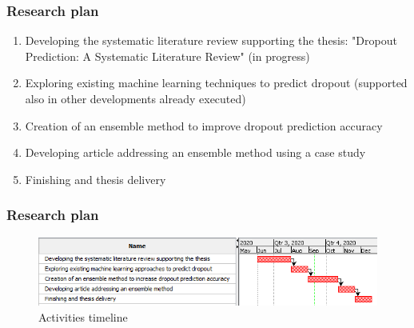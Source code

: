 \documentclass[10pt]{beamer}
\begin{document}

\begin{frame}
	\frametitle{Research plan}
	\begin{enumerate}
		\item Developing the systematic literature review supporting the thesis: "Dropout Prediction: A Systematic Literature Review" (in progress)
		\item Exploring existing machine learning techniques to predict dropout (supported also in other developments already executed)
		\item Creation of an ensemble method to improve dropout prediction accuracy
		\item Developing article addressing an ensemble method using a case study
		\item Finishing and thesis delivery
	\end{enumerate}
\end{frame}

\begin{frame}
	\frametitle{Research plan}
	\begin{figure}
		\includegraphics[scale=0.65]{../img/chronogram.png}
		\caption{Activities timeline}
		\label{figure1}
	\end{figure}
\end{frame}
\end{document}
